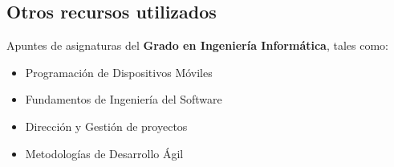 \subsection*{Otros recursos utilizados}

Apuntes de asignaturas del \textbf{Grado en Ingeniería Informática}, tales como:
\begin{itemize}
    \item Programación de Dispositivos Móviles
    \item Fundamentos de Ingeniería del Software
    \item Dirección y Gestión de proyectos
    \item Metodologías de Desarrollo Ágil
\end{itemize}
